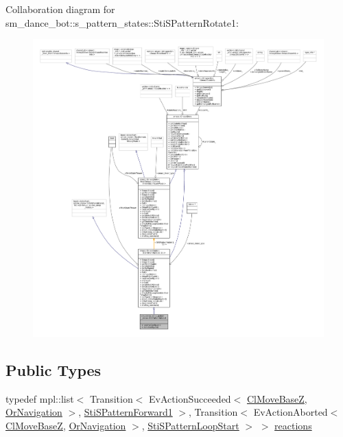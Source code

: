 Collaboration diagram for sm\+\_\+dance\+\_\+bot\+:\+:s\+\_\+pattern\+\_\+states\+:\+:Sti\+S\+Pattern\+Rotate1\+:
\nopagebreak
\begin{figure}[H]
\begin{center}
\leavevmode
\includegraphics[width=350pt]{structsm__dance__bot_1_1s__pattern__states_1_1StiSPatternRotate1__coll__graph}
\end{center}
\end{figure}
\subsection*{Public Types}
\begin{DoxyCompactItemize}
\item 
typedef mpl\+::list$<$ Transition$<$ Ev\+Action\+Succeeded$<$ \hyperlink{classmove__base__z__client_1_1ClMoveBaseZ}{Cl\+Move\+BaseZ}, \hyperlink{classsm__dance__bot_1_1OrNavigation}{Or\+Navigation} $>$, \hyperlink{structsm__dance__bot_1_1s__pattern__states_1_1StiSPatternForward1}{Sti\+S\+Pattern\+Forward1} $>$, Transition$<$ Ev\+Action\+Aborted$<$ \hyperlink{classmove__base__z__client_1_1ClMoveBaseZ}{Cl\+Move\+BaseZ}, \hyperlink{classsm__dance__bot_1_1OrNavigation}{Or\+Navigation} $>$, \hyperlink{structsm__dance__bot_1_1s__pattern__states_1_1StiSPatternLoopStart}{Sti\+S\+Pattern\+Loop\+Start} $>$ $>$ \hyperlink{structsm__dance__bot_1_1s__pattern__states_1_1StiSPatternRotate1_a0d9e39c0154f6ae391fe6982e699ebdd}{reactions}
\end{DoxyCompactItemize}
